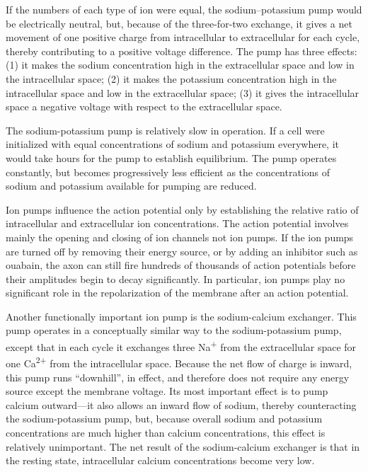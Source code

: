 If the numbers of each type of ion were equal, the sodium--potassium pump would be electrically neutral, but, because of the three-for-two exchange, it gives a net movement of one positive charge from intracellular to extracellular for each cycle, thereby contributing to a positive voltage difference. The pump has three effects: (1) it makes the sodium concentration high in the extracellular space and low in the intracellular space; (2) it makes the potassium concentration high in the intracellular space and low in the extracellular space; (3) it gives the intracellular space a negative voltage with respect to the extracellular space.

The sodium-potassium pump is relatively slow in operation. If a cell were initialized with equal concentrations of sodium and potassium everywhere, it would take hours for the pump to establish equilibrium. The pump operates constantly, but becomes progressively less efficient as the concentrations of sodium and potassium available for pumping are reduced.

Ion pumps influence the action potential only by establishing the relative ratio of intracellular and extracellular ion concentrations. The action potential involves mainly the opening and closing of ion channels not ion pumps. If the ion pumps are turned off by removing their energy source, or by adding an inhibitor such as ouabain, the axon can still fire hundreds of thousands of action potentials before their amplitudes begin to decay significantly. In particular, ion pumps play no significant role in the repolarization of the membrane after an action potential.

Another functionally important ion pump is the sodium-calcium exchanger. This pump operates in a conceptually similar way to the sodium-potassium pump, except that in each cycle it exchanges three Na\textsuperscript{+} from the extracellular space for one Ca\textsuperscript{2+} from the intracellular space. Because the net flow of charge is inward, this pump runs ``downhill'', in effect, and therefore does not require any energy source except the membrane voltage. Its most important effect is to pump calcium outward---it also allows an inward flow of sodium, thereby counteracting the sodium-potassium pump, but, because overall sodium and potassium concentrations are much higher than calcium concentrations, this effect is relatively unimportant. The net result of the sodium-calcium exchanger is that in the resting state, intracellular calcium concentrations become very low.

